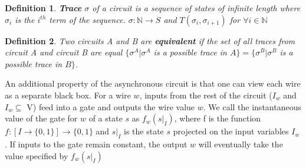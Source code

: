 \documentclass{article}
\newtheorem*{definition}{Definition}
\begin{document}
\begin{definition} \textbf{Trace} $\sigma$ of a circuit is a sequence of states of infinite length where $\sigma_i$ is the $i^{th}$ term of the sequence.  $\sigma: \mathbb{N} \to S$ and $T(\sigma_i,\sigma_{i+1})$ for $\forall i \in \mathbb{N}$\end{definition} 

\begin{definition} Two circuits A and B are \textbf{equivalent} if the set of all traces from circuit A and circuit B are equal $\{\sigma^A |\sigma^A$ is a possible trace in $A\}=\{\sigma^B |\sigma^B$ is a possible trace in $B\}$.
\end{definition}

An additional property of the asynchronous circuit is that one can view each wire as a separate black box.  For a wire $w$, inputs from the rest of the circuit ($I_w$ and $I_w \subseteq$ V) feed into a gate and outputs the wire value $w$.  We call the instantaneous value of the gate for $w$ of a state $s$ as $f_w(s|_I)$, where f is the function $f:[I \to \{0,1\}] \to \{0,1\}$ and $s|_I$ is the state $s$ projected on the input variables $I_w$.  If inputs to the gate remain constant, the output $w$ will eventually take the value specified by $f_w(s|_I)$  %
\newline
\end{document}
